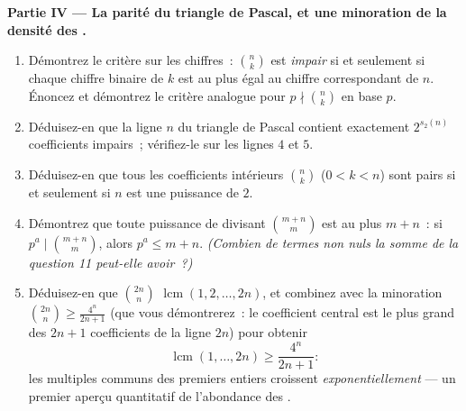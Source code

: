 \begin{problem}
\medskip
\noindent\textbf{Partie IV --- La parité du triangle de Pascal, et
une minoration de la densité des .}
\begin{enumerate}[resume]
  \item Démontrez le critère sur les chiffres~: $\binom nk$ est \emph{impair} si
        et seulement si chaque chiffre binaire de $k$ est au plus égal au
        chiffre correspondant de $n$. Énoncez et démontrez le critère
        analogue pour $p \nmid \binom nk$ en base $p$.
  \item Déduisez-en que la ligne $n$ du triangle de Pascal contient exactement
        $2^{s_2(n)}$ coefficients impairs~; vérifiez-le sur les lignes $4$ et $5$.
  \item Déduisez-en que tous les coefficients intérieurs $\binom nk$ ($0 < k < n$)
        sont pairs si et seulement si $n$ est une puissance de $2$.
  \item Démontrez que toute puissance de  divisant $\binom{m+n}m$ est au
        plus $m + n$~: si $p^a \mid \binom{m+n}m$, alors $p^a \leq
        m + n$. \emph{(Combien de termes non nuls la somme de
        la question 11 peut-elle avoir~?)}
  \item Déduisez-en que $\binom{2n}n$ 
        $\operatorname{lcm}(1, 2, \dots, 2n)$, et combinez avec
        la minoration $\binom{2n}n \geq \frac{4^n}{2n+1}$
        (que vous démontrerez~: le coefficient central est le plus grand
        des $2n + 1$ coefficients de la ligne $2n$) pour obtenir
        \[
        \operatorname{lcm}(1, \dots, 2n) \geq \frac{4^n}{2n+1} :
        \]
        les multiples communs des premiers entiers croissent
        \emph{exponentiellement} --- un premier aperçu quantitatif de
        l'abondance des .
\end{enumerate}


\end{problem}
